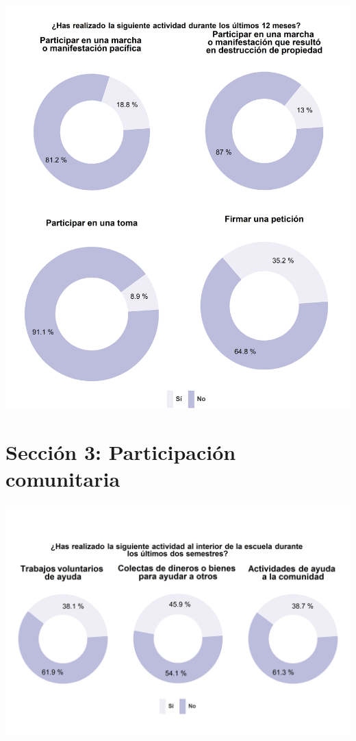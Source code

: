 \documentclass[
  14pt,
]{book}
\begin{document}
\begin{center}\includegraphics[width=52.49in]{images/graph_partact} \end{center}

\hypertarget{secciuxf3n-3-participaciuxf3n-comunitaria}{%
\section{Sección 3: Participación comunitaria}\label{secciuxf3n-3-participaciuxf3n-comunitaria}}

\begin{center}\includegraphics[width=52.49in]{images/graph_partcom_esc} \end{center}
\end{document}
